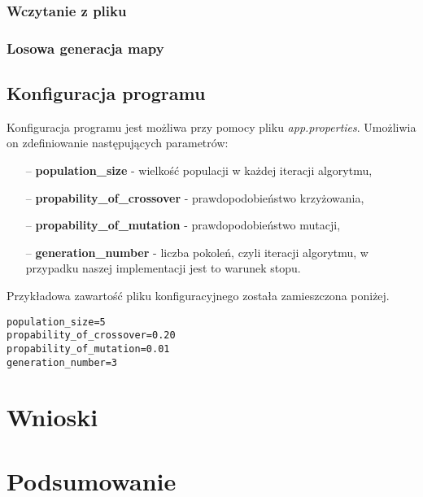 \documentclass[10pt,a4paper]{article}
\begin{document}
\subsubsection{Wczytanie z pliku}
\subsubsection{Losowa generacja mapy}

\subsection{Konfiguracja programu}
Konfiguracja programu jest możliwa przy pomocy pliku \textit{app.properties}. Umożliwia on zdefiniowanie następujących parametrów:
\begin{itemize}
\item[--] \textbf{population\_size} - wielkość populacji w każdej iteracji algorytmu,
\item[--] \textbf{propability\_of\_crossover} - prawdopodobieństwo krzyżowania,
\item[--] \textbf{propability\_of\_mutation} - prawdopodobieństwo mutacji,
\item[--] \textbf{generation\_number} - liczba pokoleń, czyli iteracji algorytmu, w przypadku naszej implementacji jest to warunek stopu.
\end{itemize}

Przykładowa zawartość pliku konfiguracyjnego została zamieszczona poniżej.
\begin{verbatim}
population_size=5
propability_of_crossover=0.20
propability_of_mutation=0.01
generation_number=3
\end{verbatim}

\section{Wnioski}

\section{Podsumowanie}
\end{document}
